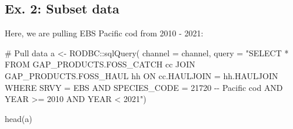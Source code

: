 \documentclass[
  letterpaper,
  oneside,
  open=any]{scrbook}
\newenvironment{Shaded}{\begin{snugshade}}{\end{snugshade}}
\newcommand{\AttributeTok}[1]{\textcolor[rgb]{0.40,0.45,0.13}{#1}}
\newcommand{\CommentTok}[1]{\textcolor[rgb]{0.37,0.37,0.37}{#1}}
\newcommand{\FunctionTok}[1]{\textcolor[rgb]{0.28,0.35,0.67}{#1}}
\newcommand{\NormalTok}[1]{\textcolor[rgb]{0.00,0.23,0.31}{#1}}
\newcommand{\OtherTok}[1]{\textcolor[rgb]{0.00,0.23,0.31}{#1}}
\newcommand{\SpecialCharTok}[1]{\textcolor[rgb]{0.37,0.37,0.37}{#1}}
\newcommand{\StringTok}[1]{\textcolor[rgb]{0.13,0.47,0.30}{#1}}
\begin{document}
\hypertarget{ex.-2-subset-data}{%
\subsection{Ex. 2: Subset data}\label{ex.-2-subset-data}}

Here, we are pulling EBS Pacific cod from 2010 - 2021:

\begin{Shaded}
\begin{Highlighting}[]
\CommentTok{\# Pull data}
\NormalTok{a }\OtherTok{\textless{}{-}}\NormalTok{ RODBC}\SpecialCharTok{::}\FunctionTok{sqlQuery}\NormalTok{(}
\AttributeTok{channel =}\NormalTok{ channel, }
\AttributeTok{query =} 
\StringTok{"SELECT * FROM GAP\_PRODUCTS.FOSS\_CATCH cc}
\StringTok{JOIN GAP\_PRODUCTS.FOSS\_HAUL hh}
\StringTok{ON cc.HAULJOIN = hh.HAULJOIN}
\StringTok{WHERE SRVY = \textquotesingle{}EBS\textquotesingle{} }
\StringTok{AND SPECIES\_CODE = 21720 {-}{-} \textquotesingle{}Pacific cod\textquotesingle{} }
\StringTok{AND YEAR \textgreater{}= 2010 }
\StringTok{AND YEAR \textless{} 2021"}\NormalTok{)}

\FunctionTok{head}\NormalTok{(a)}
\end{Highlighting}
\end{Shaded}
\end{document}
